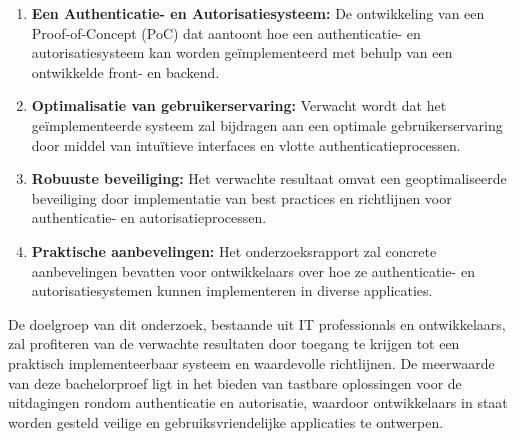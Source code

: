 \begin{enumerate}
    \item \textbf{Een Authenticatie- en Autorisatiesysteem:} 
    De ontwikkeling van een Proof-of-Concept (PoC) dat aantoont hoe een authenticatie- en autorisatiesysteem kan worden geïmplementeerd met 
    behulp van een ontwikkelde front- en backend.

    \item \textbf{Optimalisatie van gebruikerservaring:} 
    Verwacht wordt dat het geïmplementeerde systeem zal bijdragen aan een optimale gebruikerservaring door middel van intuïtieve interfaces en 
    vlotte authenticatieprocessen.

    \item \textbf{Robuuste beveiliging:} 
    Het verwachte resultaat omvat een geoptimaliseerde beveiliging door implementatie van best practices en richtlijnen voor authenticatie- en 
    autorisatieprocessen.

    \item \textbf{Praktische aanbevelingen:}
    Het onderzoeksrapport zal concrete aanbevelingen bevatten voor ontwikkelaars over hoe ze authenticatie- en autorisatiesystemen kunnen 
    implementeren in diverse applicaties.
\end{enumerate}

De doelgroep van dit onderzoek, bestaande uit IT professionals en ontwikkelaars, zal profiteren van de verwachte resultaten door toegang te krijgen 
tot een praktisch implementeerbaar systeem en waardevolle richtlijnen. De meerwaarde van deze bachelorproef ligt in het bieden van tastbare 
oplossingen voor de uitdagingen rondom authenticatie en autorisatie, waardoor ontwikkelaars in staat worden gesteld veilige en gebruiksvriendelijke 
applicaties te ontwerpen.
